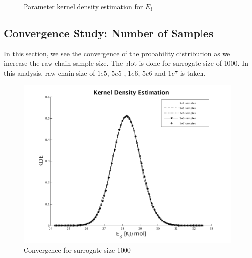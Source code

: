   \begin{figure}[H]
  \ContinuedFloat
  \centering
{}
\caption{ Parameter  kernel density estimation for $E_3$}
\end{figure}
%

\subsection{Convergence Study: Number of Samples }

 In this section, we see the convergence of the probability distribution as we increase the raw chain sample size. The plot is done for surrogate size of 1000. In this analysis, raw chain size of $1e5$, $5e5$ , $1e6$, $5e6$ and $1e7$ is taken.

\begin{figure}[H]
\includegraphics[scale = 0.5]{model_1/sample_conv}
    \caption{Convergence for surrogate size 1000}
\end{figure}


